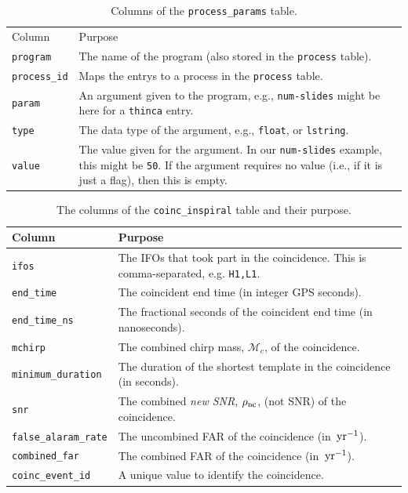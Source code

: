 \begin{table}[p]
\label{tab:process_params}
\center
\begin{tabular}{l | p{10cm}}
Column      &   Purpose     \\
\texttt{program}    &   The name of the program (also stored in the \texttt{process} table). \\
\hline
\texttt{process\_id}    &   Maps the entrys to a process in the \texttt{process} table. \\
\hline
\texttt{param}      &   An argument given to the program, e.g., \texttt{num-slides} might be here for a \texttt{thinca} entry. \\
\hline
\texttt{type}   &   The data type of the argument, e.g., \texttt{float}, or \texttt{lstring}. \\
\hline
\texttt{value}  &   The value given for the argument. In our \texttt{num-slides} example, this might be \texttt{50}. If the argument requires no value (i.e., if it is just a flag), then this is empty.
\end{tabular}
\caption{Columns of the \texttt{process\_params} table.}
\end{table}

\pagebreak

\begin{table}[p]
\label{tab:coinc_inspiral}
\center
\begin{tabular}{l | p{10cm}}
Column      &   Purpose     \\
\hline \hline
\texttt{ifos}   &   The \acp{IFO} that took part in the coincidence. This is comma-separated, e.g. \texttt{H1,L1}. \\
\hline
\texttt{end\_time}  &   The coincident end time (in integer GPS seconds). \\
\hline
\texttt{end\_time\_ns} &    The fractional seconds of the coincident end time (in nanoseconds). \\
\hline
\texttt{mchirp} &   The combined chirp mass, $\mathcal{M}_c$, of the coincidence. \\
\hline
\texttt{minimum\_duration}  &   The duration of the shortest template in the coincidence (in seconds). \\
\hline
\texttt{snr}    &   The combined \emph{new \ac{SNR}}, $\rho_{\mathrm{nc}}$, (not \ac{SNR}) of the coincidence. \\
\hline
\texttt{false\_alaram\_rate} & The uncombined \ac{FAR} of the coincidence (in $\,\mathrm{yr}^{-1}$). \\
\hline
\texttt{combined\_far}  & The combined \ac{FAR} of the coincidence (in $\,\mathrm{yr}^{-1}$). \\
\hline
\texttt{coinc\_event\_id}   & A unique value to identify the coincidence.
\end{tabular}
\caption{The columns of the \texttt{coinc\_inspiral} table and their purpose.}
\end{table}

